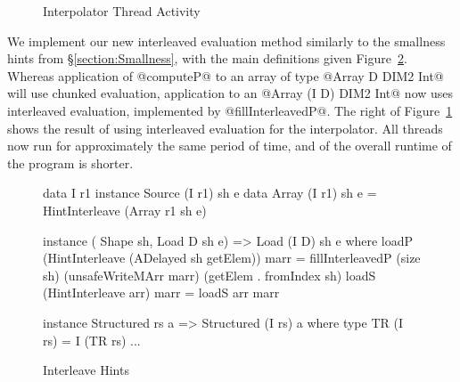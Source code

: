 \begin{figure}
\begin{center}
\caption{Interpolator Thread Activity}
\label{figure:InterpolatorThreads}
\end{center}
\end{figure}

We implement our new interleaved evaluation method similarly to the smallness hints from \S\ref{section:Smallness}, with the main definitions given Figure~\ref{figure:InterleaveHints}. Whereas application of @computeP@ to an array of type @Array D DIM2 Int@ will use chunked evaluation, application to an @Array (I D) DIM2 Int@ now uses interleaved evaluation, implemented by @fillInterleavedP@. The right of Figure~\ref{figure:InterpolatorThreads} shows the result of using interleaved evaluation for the interpolator. All threads now run for approximately the same period of time, and of the overall runtime of the program is shorter. 



\begin{figure}
\begin{small}
\begin{code}
data I r1
instance Source (I r1) sh e
 data Array (I r1) sh e
        = HintInterleave (Array r1 sh e)

instance ( Shape sh, Load D sh e) 
        => Load (I D) sh e where
 loadP (HintInterleave (ADelayed sh getElem)) marr 
   = fillInterleavedP (size sh) (unsafeWriteMArr marr) 
                                (getElem . fromIndex sh) 
 loadS (HintInterleave arr) marr = loadS arr marr

instance Structured rs a => Structured (I rs) a where
 type TR (I rs) = I (TR rs)
 ...
\end{code}
\end{small}
\caption{Interleave Hints}
\label{figure:InterleaveHints}
\end{figure}



